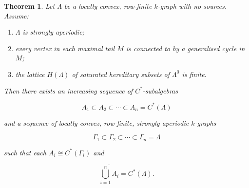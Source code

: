 \documentclass[10pt,a4paper]{amsart}
\newtheorem{theorem}{Theorem}
\begin{document}
\begin{theorem}\label{thm:approx}
Let $\Lambda$ be a locally convex, row-finite $k$-graph with no sources.
Assume:
\begin{enumerate}
\item $\Lambda$ is strongly aperiodic;
\item every vertex in each maximal tail $M$ is connected to by a
      generalised cycle in $M$;
\item the lattice $H(\Lambda)$ of saturated hereditary subsets of
      $\Lambda^0$ is finite.
\end{enumerate}
Then there exists an increasing sequence of $C^*$-subalgebras


\[
A_1 \subset A_2 \subset \cdots \subset A_n = C^*(\Lambda)
\]


and a sequence of locally convex, row-finite, strongly aperiodic
$k$-graphs


\[
\Gamma_1 \subset \Gamma_2 \subset \cdots \subset \Gamma_n = \Lambda
\]


such that each $A_i \cong C^*(\Gamma_i)$ and


\[
\overline{\bigcup_{i=1}^n A_i} = C^*(\Lambda).
\]


\end{theorem}
\end{document}
